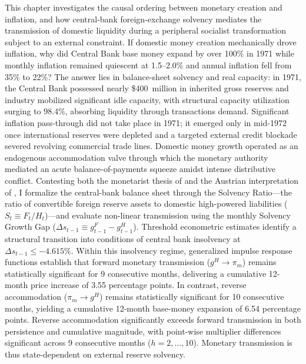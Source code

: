 This chapter investigates the causal ordering between monetary creation and inflation, and how central-bank foreign-exchange solvency mediates the transmission of domestic liquidity during a peripheral socialist transformation subject to an external constraint. If domestic money creation mechanically drove inflation, why did Central Bank base money expand by over 100\% in 1971 while monthly inflation remained quiescent at 1.5--2.0\% and annual inflation fell from 35\% to 22\%? The answer lies in balance-sheet solvency and real capacity: in 1971, the Central Bank possessed nearly \$400~million in inherited gross reserves and industry mobilized significant idle capacity, with structural capacity utilization surging to 98.4\%, absorbing liquidity through transactions demand. Significant inflation pass-through did not take place in 1971; it emerged only in mid-1972 once international reserves were depleted and a targeted external credit blockade severed revolving commercial trade lines. Domestic money growth operated as an endogenous accommodation valve through which the monetary authority mediated an acute balance-of-payments squeeze amidst intense distributive conflict. Contesting both the monetarist thesis of \citet{Edwards2024} and the Austrian interpretation of \citet{EspinosaVejar2025}, I formalize the central-bank balance sheet through the Solvency Ratio---the ratio of convertible foreign reserve assets to domestic high-powered liabilities ($S_t \equiv F_t / H_t$)---and evaluate non-linear transmission using the monthly Solvency Growth Gap ($\Delta s_{t-1} \equiv g^F_{t-1} - g^H_{t-1}$). Threshold econometric estimates identify a structural transition into conditions of central bank insolvency at $\Delta s_{t-1} \le -4.615\%$. Within this insolvency regime, generalized impulse response functions establish that forward monetary transmission ($g^H \to \pi_m$) remains statistically significant for 9 consecutive months, delivering a cumulative 12-month price increase of 3.55 percentage points. In contrast, reverse accommodation ($\pi_m \to g^H$) remains statistically significant for 10 consecutive months, yielding a cumulative 12-month base-money expansion of 6.54 percentage points. Reverse accommodation significantly exceeds forward transmission in both persistence and cumulative magnitude, with point-wise multiplier differences significant across 9 consecutive months ($h=2,\dots,10$). Monetary transmission is thus state-dependent on external reserve solvency.

